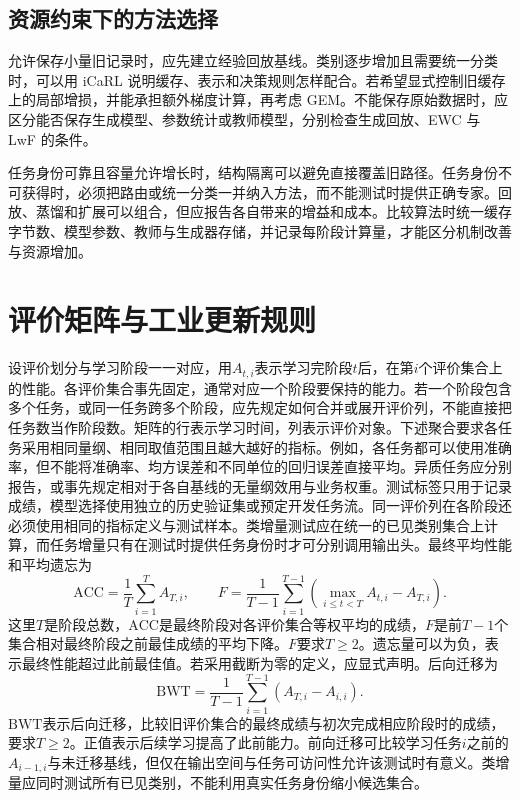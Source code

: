 \subsection{资源约束下的方法选择}
允许保存小量旧记录时，应先建立经验回放基线。类别逐步增加且需要统一分类时，可以用 iCaRL 说明缓存、表示和决策规则怎样配合。若希望显式控制旧缓存上的局部增损，并能承担额外梯度计算，再考虑 GEM。不能保存原始数据时，应区分能否保存生成模型、参数统计或教师模型，分别检查生成回放、EWC 与 LwF 的条件。

任务身份可靠且容量允许增长时，结构隔离可以避免直接覆盖旧路径。任务身份不可获得时，必须把路由或统一分类一并纳入方法，而不能测试时提供正确专家。回放、蒸馏和扩展可以组合，但应报告各自带来的增益和成本。比较算法时统一缓存字节数、模型参数、教师与生成器存储，并记录每阶段计算量，才能区分机制改善与资源增加。

\section{评价矩阵与工业更新规则}
设评价划分与学习阶段一一对应，用$A_{t,i}$表示学习完阶段$t$后，在第$i$个评价集合上的性能。各评价集合事先固定，通常对应一个阶段要保持的能力。若一个阶段包含多个任务，或同一任务跨多个阶段，应先规定如何合并或展开评价列，不能直接把任务数当作阶段数。矩阵的行表示学习时间，列表示评价对象。下述聚合要求各任务采用相同量纲、相同取值范围且越大越好的指标。例如，各任务都可以使用准确率，但不能将准确率、均方误差和不同单位的回归误差直接平均。异质任务应分别报告，或事先规定相对于各自基线的无量纲效用与业务权重。测试标签只用于记录成绩，模型选择使用独立的历史验证集或预定开发任务流。同一评价列在各阶段还必须使用相同的指标定义与测试样本。类增量测试应在统一的已见类别集合上计算，而任务增量只有在测试时提供任务身份时才可分别调用输出头。最终平均性能和平均遗忘为
\begin{equation}
 \mathrm{ACC}=\frac1T\sum_{i=1}^TA_{T,i},\qquad
 F=\frac1{T-1}\sum_{i=1}^{T-1}
 \left(\max_{i\leq t<T}A_{t,i}-A_{T,i}\right).
\end{equation}
这里$T$是阶段总数，$\mathrm{ACC}$是最终阶段对各评价集合等权平均的成绩，$F$是前$T-1$个集合相对最终阶段之前最佳成绩的平均下降。$F$要求$T\geq2$。遗忘量可以为负，表示最终性能超过此前最佳值。若采用截断为零的定义，应显式声明。后向迁移为
\begin{equation}
 \mathrm{BWT}=\frac1{T-1}\sum_{i=1}^{T-1}(A_{T,i}-A_{i,i}).
\end{equation}
$\mathrm{BWT}$表示后向迁移，比较旧评价集合的最终成绩与初次完成相应阶段时的成绩，要求$T\geq2$。正值表示后续学习提高了此前能力。前向迁移可比较学习任务$i$之前的$A_{i-1,i}$与未迁移基线，但仅在输出空间与任务可访问性允许该测试时有意义\cite{lopezpaz2017gem}。类增量应同时测试所有已见类别，不能利用真实任务身份缩小候选集合。

